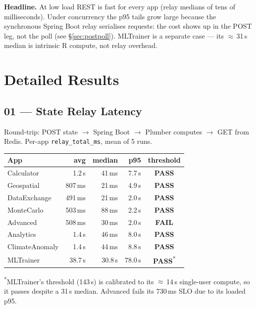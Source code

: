 \documentclass[11pt,a4paper]{article}
\newcommand{\pass}{\textcolor{pass}{\textbf{PASS}}}
\newcommand{\fail}{\textcolor{fail}{\textbf{FAIL}}}
\begin{document}
\medskip
\noindent\textbf{Headline.} At low load REST is fast for every app (relay
medians of tens of milliseconds). Under concurrency the p95 tails grow large
because the synchronous Spring Boot relay serialises requests: the cost shows
up in the POST leg, not the poll (see \S\ref{sec:postpoll}). MLTrainer is a
separate case — its $\approx$\,31\,s median is intrinsic R compute, not relay
overhead.

\section{Detailed Results}

\subsection{01 — State Relay Latency}

Round-trip: POST state $\to$ Spring Boot $\to$ Plumber computes $\to$ GET from
Redis. Per-app \texttt{relay\_total\_ms}, mean of 5 runs.

\begin{tabular}{@{}lrrrc@{}}
\toprule
\textbf{App} & \textbf{avg} & \textbf{median} & \textbf{p95} & \textbf{threshold} \\
\midrule
Calculator      & 1.2\,s  & 41\,ms  & 7.7\,s  & \pass \\
Geospatial      & 807\,ms & 21\,ms  & 4.9\,s  & \pass \\
DataExchange    & 491\,ms & 21\,ms  & 2.0\,s  & \pass \\
MonteCarlo      & 503\,ms & 88\,ms  & 2.2\,s  & \pass \\
Advanced        & 508\,ms & 30\,ms  & 2.0\,s  & \fail \\
Analytics       & 1.4\,s  & 46\,ms  & 8.0\,s  & \pass \\
ClimateAnomaly  & 1.4\,s  & 44\,ms  & 8.8\,s  & \pass \\
MLTrainer       & 38.7\,s & 30.8\,s & 78.0\,s & \pass\textsuperscript{*} \\
\bottomrule
\end{tabular}

\medskip
\noindent\footnotesize\textsuperscript{*}MLTrainer's threshold (143\,s) is
calibrated to its $\approx$\,14\,s single-user compute, so it passes despite a
31\,s median. Advanced fails its 730\,ms SLO due to its loaded p95.
\normalsize
\end{document}
